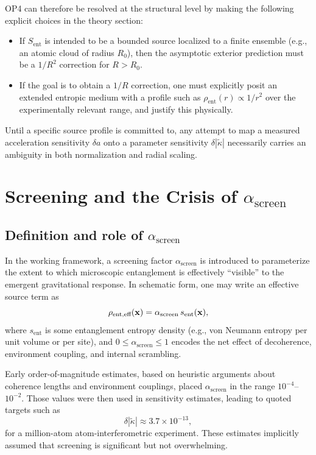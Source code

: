 \documentclass[11pt]{article}
\begin{document}
OP4 can therefore be resolved at the structural level by making the following explicit choices in the theory section:
\begin{itemize}
 \item If $S_{\text{ent}}$ is intended to be a bounded source localized to a finite ensemble (e.g., an atomic cloud of radius $R_0$), then the asymptotic exterior prediction must be a $1/R^2$ correction for $R>R_0$.
 \item If the goal is to obtain a $1/R$ correction, one must explicitly posit an extended entropic medium with a profile such as $\rho_{\text{ent}}(r)\propto 1/r^2$ over the experimentally relevant range, and justify this physically.
\end{itemize}

Until a specific source profile is committed to, any attempt to map a measured acceleration sensitivity $\delta a$ onto a parameter sensitivity $\delta|\tilde{\kappa}|$ necessarily carries an ambiguity in both normalization and radial scaling.

\section{Screening and the Crisis of $\alpha_{\text{screen}}$}

\subsection{Definition and role of $\alpha_{\text{screen}}$}

In the working framework, a screening factor $\alpha_{\text{screen}}$ is introduced to parameterize the extent to which microscopic entanglement is effectively ``visible'' to the emergent gravitational response. In schematic form, one may write an effective source term as
\begin{equation}
 \rho_{\text{ent,eff}}(\vb{x}) = \alpha_{\text{screen}}\,s_{\text{ent}}(\vb{x}),
\end{equation}
where $s_{\text{ent}}$ is some entanglement entropy density (e.g., von Neumann entropy per unit volume or per site), and $0\leq \alpha_{\text{screen}}\leq 1$ encodes the net effect of decoherence, environment coupling, and internal scrambling.

Early order-of-magnitude estimates, based on heuristic arguments about coherence lengths and environment couplings, placed $\alpha_{\text{screen}}$ in the range $10^{-4}$--$10^{-2}$. Those values were then used in sensitivity estimates, leading to quoted targets such as
\begin{equation}
 \delta|\tilde{\kappa}| \approx 3.7\times 10^{-13},
\end{equation}
for a million-atom atom-interferometric experiment. These estimates implicitly assumed that screening is significant but not overwhelming.
\end{document}
